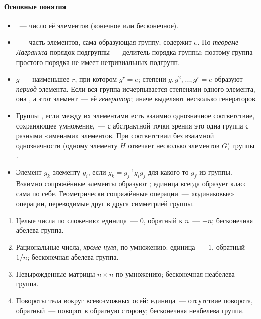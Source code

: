 \paragraph{Основные понятия}
\begin{itemize}
\item {}~— число её элементов (конечное или
бесконечное).
\item {}~— часть элементов, сама образующая группу; содержит
$e$. По \emph{теореме Лагранжа} порядок подгруппы~— делитель порядка
группы; поэтому группа простого порядка не имеет нетривиальных подгрупп.
\item {} $g$~— наименьшее $r$, при котором $g^r=e$;
степени $g,g^2,\ldots,g^r=e$ образуют \emph{период} элемента. Если вся группа
исчерпывается степенями одного элемента, она , а этот
элемент~— её \emph{генератор}; иначе выделяют несколько генераторов.
\item Группы , если между их элементами есть взаимно
однозначное соответствие, сохраняющее умножение,~— с абстрактной точки
зрения это одна группа с разными «именами» элементов. При соответствии
без взаимной однозначности (одному элементу $H$ отвечает несколько
элементов $G$) группы .
\item Элемент $g_k$  элементу $g_i$, если $g_k=g_j^{-1}g_ig_j$ для
какого-то $g_j$ из группы. Взаимно сопряжённые элементы образуют
; единица всегда образует класс сама по себе. Геометрически
сопряжённые операции~— «одинаковые» операции, переводимые друг в друга
симметрией группы.
\end{itemize}

\begin{primer*}
\begin{enumerate}
\item Целые числа по сложению: единица~— $0$, обратный к $n$~— $-n$;
бесконечная абелева группа.
\item Рациональные числа, \emph{кроме нуля}, по умножению: единица~— $1$,
обратный~— $1/n$; бесконечная абелева группа\isprmark.
\item Невырожденные матрицы $n\times n$ по умножению; бесконечная
неабелева группа.
\item Повороты тела вокруг всевозможных осей: единица~— отсутствие
поворота, обратный~— поворот в обратную сторону; бесконечная неабелева
группа.
\end{enumerate}
\end{primer*}

